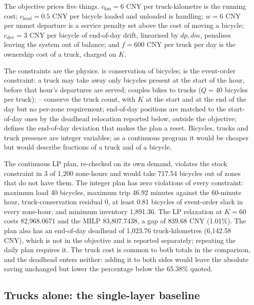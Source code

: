 The objective prices five things. $c_{\text{km}}=6$ CNY per truck-kilometre is the
running cost; $c_{\text{load}}=0.5$ CNY per bicycle loaded and unloaded is handling;
$w=6$ CNY per unmet departure is a service penalty set above the cost of moving a
bicycle; $c_{\text{dev}}=3$ CNY per bicycle of end-of-day drift, linearised by $dp,dm$,
penalises leaving the system out of balance; and $f=600$ CNY per truck per day is the
ownership cost of a truck, charged on $K$.

The constraints are the physics.  is conservation of bicycles;
 is the event-order constraint: a truck may take away only bicycles
present at the start of the hour, before that hour's departures are served;
 couples bikes to trucks ($Q=40$ bicycles per truck);
-- conserve the truck count, with $K$ at the
start and at the end of the day but no per-zone requirement; end-of-day positions are
matched to the start-of-day ones by the deadhead relocation reported below, outside the
objective;  defines the end-of-day deviation that
makes the plan a reset. Bicycles, trucks and truck presence are integer variables; as
a continuous program it would be cheaper but would describe fractions of a
truck and of a bicycle.

The continuous LP plan, re-checked
on its own demand, violates the stock constraint in 3 of 1,200 zone-hours and would
take 717.54 bicycles out of zones that do not have them. The integer plan has zero
violations of every constraint: maximum load 40 bicycles, maximum trip 46.92 minutes
against the 60-minute hour, truck-conservation residual 0, at least 0.81 bicycles of
event-order slack in every zone-hour, and minimum inventory 1,891.36. The LP relaxation
at $K=60$ costs 82,968.0671 and the MILP 83,807.7438, a gap of 839.68 CNY (1.01\%). The plan also has an end-of-day deadhead of 1,023.76 truck-kilometres
(6,142.58 CNY), which is not in the objective and is reported separately; repeating the
daily plan requires it. The truck cost is common to both totals in the comparison, and
the deadhead enters neither: adding it to both sides would leave the absolute saving
unchanged but lower the percentage below the 65.38\% quoted.

\subsection{Trucks alone: the single-layer baseline}

